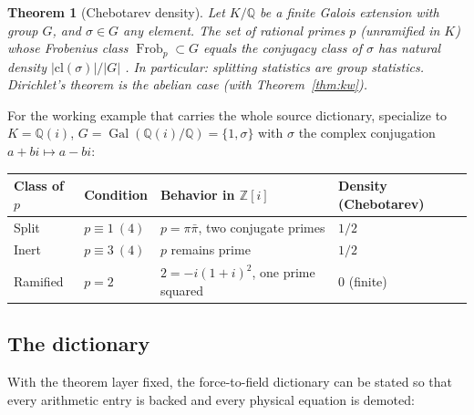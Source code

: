\documentclass[11pt,a4paper]{article}
\theoremstyle{plain}
\newtheorem{theorem}{Theorem}[section]
\theoremstyle{definition}
\theoremstyle{remark}
\newcommand{\Zz}{\mathbb{Z}}
\newcommand{\Qq}{\mathbb{Q}}
\DeclareMathOperator{\Gal}{Gal}
\DeclareMathOperator{\Frob}{Frob}
\begin{document}
\begin{theorem}[Chebotarev density]\label{thm:chebotarev}
Let $K/\Qq$ be a finite Galois extension with group $G$, and $\sigma\in G$ any element. The
set of rational primes $p$ (unramified in $K$) whose Frobenius class
$\Frob_{p}\subset G$ equals the conjugacy class of $\sigma$ has natural density
$|\mathrm{cl}(\sigma)|/|G|$ \cite{chebotarev1926}. In particular: splitting statistics are
group statistics. Dirichlet's theorem is the abelian case (with
Theorem~\ref{thm:kw}).
\end{theorem}

For the working example that carries the whole source dictionary, specialize to
$K=\Qq(i)$, $G=\Gal(\Qq(i)/\Qq)=\{1,\sigma\}$ with $\sigma$ the complex conjugation
$a+bi\mapsto a-bi$:

\begin{center}
\begin{tabular}{@{}llll@{}}
\toprule
Class of $p$ & Condition & Behavior in $\Zz[i]$ & Density (Chebotarev)\\
\midrule
Split & $p\equiv1\ (4)$ & $p=\pi\bar\pi$, two conjugate primes & $1/2$\\
Inert & $p\equiv3\ (4)$ & $p$ remains prime & $1/2$\\
Ramified & $p=2$ & $2=-i(1+i)^{2}$, one prime squared & $0$ (finite)\\
\bottomrule
\end{tabular}
\end{center}

\subsection{The dictionary}

With the theorem layer fixed, the force-to-field dictionary can be stated so that
every arithmetic entry is backed and every physical equation is demoted:
\end{document}
